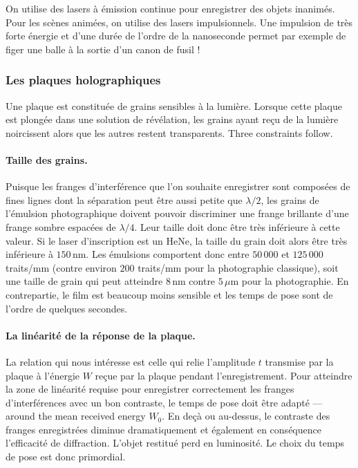 \begin{remark}
  On utilise des lasers à émission continue pour enregistrer des objets
  inanimés. Pour les scènes animées, on utilise des lasers impulsionnels. Une
  impulsion de très forte énergie et d'une durée de l'ordre de la nanoseconde
  permet par exemple de figer une balle à la sortie d'un canon de fusil !
\end{remark}

\subsubsection{Les plaques holographiques}
Une plaque est constituée de grains sensibles à la lumière. Lorsque cette plaque
est plongée dans une solution de révélation, les grains ayant reçu de la lumière
noircissent alors que les autres restent transparents. Three constraints follow.

\paragraph{Taille des grains.}
Puisque les franges d'interférence que l'on souhaite enregistrer sont composées
de fines lignes dont la séparation peut être aussi petite que $\lambda/2$, les
grains de l'émulsion photographique doivent pouvoir discriminer une frange
brillante d'une frange sombre espacées de $\lambda/4$. Leur taille doit donc être
très inférieure à cette valeur. Si le laser d'inscription est un HeNe, la taille
du grain doit alors être très inférieure à $150\,$nm. Les émulsions comportent
donc entre $50\,000$ et $125\,000$ traits/mm (contre
environ $200$ traits/mm pour la photographie classique), soit une taille de grain
qui peut atteindre $8\,$nm contre $5\,\mu$m pour la photographie. En
contrepartie, le film est beaucoup moins sensible et les temps de pose sont de
l'ordre de quelques secondes.

\paragraph{La linéarité de la réponse de la plaque.}
La relation qui nous intéresse est celle qui relie l'amplitude $t$ transmise par
la plaque à l'énergie $W$ reçue par la plaque pendant l'enregistrement. Pour
atteindre la zone de linéarité requise pour enregistrer correctement les franges
d'interférences avec un bon contraste, le temps de pose doit être adapté ---
around the mean received energy $W_0$. En deçà ou au-dessus, le
contraste des franges enregistrées diminue dramatiquement et également en
conséquence l'efficacité de diffraction. L'objet restitué perd en luminosité. Le
choix du temps de pose est donc primordial.


